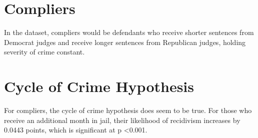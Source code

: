 \documentclass{article}
\begin{document}
\section{Compliers}
In the dataset, compliers would be defendants who receive shorter sentences from Democrat judges and receive longer sentences from Republican judges, holding severity of crime constant.

\section{Cycle of Crime Hypothesis}
For compliers, the cycle of crime hypothesis does seem to be true. For those who receive an additional month in jail, their likelihood of recidivism increases by 0.0443 points, which is significant at p \textless 0.001.
\end{document}
